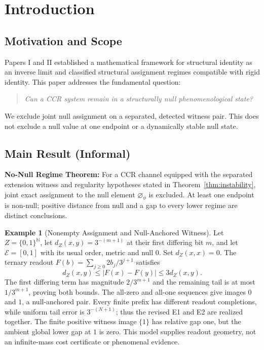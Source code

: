 \documentclass[11pt,a4paper]{article}
\theoremstyle{plain}
\theoremstyle{definition}
\newtheorem{example}[theorem]{Example}
\theoremstyle{remark}
\newcommand{\E}{\mathcal{E}}
\newcommand{\nullphi}{\varnothing_\phi}
\begin{document}
\section{Introduction}

\subsection{Motivation and Scope}

Papers I and II established a mathematical framework for structural identity as an inverse limit and classified structural assignment regimes compatible with rigid identity. This paper addresses the fundamental question:

\begin{quote}
\emph{Can a CCR system remain in a structurally null phenomenological state?}
\end{quote}

We exclude joint null assignment on a separated, detected witness pair. This does not exclude a null value at one endpoint or a dynamically stable null state.

\subsection{Main Result (Informal)}

\textbf{No-Null Regime Theorem:} For a CCR channel equipped with the separated extension witness and regularity hypotheses stated in Theorem~\ref{thm:instability}, joint exact assignment to the null element $\nullphi$ is excluded. At least one endpoint is non-null; positive distance from null and a gap to every lower regime are distinct conclusions.

\begin{example}[Nonempty Assignment and Null-Anchored Witness]\label{ex:null-realization}
Let $Z=\{0,1\}^{\mathbb N}$, let $d_Z(x,y)=3^{-(m+1)}$ at their first differing bit $m$, and let $\E=[0,1]$ with its usual order, metric and null $0$. Set $d_Z(x,x)=0$. The ternary readout $F(b)=\sum_{j\geq0}2b_j/3^{j+1}$ satisfies
\[
d_Z(x,y)\leq |F(x)-F(y)|\leq3d_Z(x,y).
\]
The first differing term has magnitude $2/3^{m+1}$ and the remaining tail is at most $1/3^{m+1}$, proving both bounds. The all-zero and all-one sequences give images $0$ and $1$, a null-anchored pair. Every finite prefix has different readout completions, while uniform tail error is $3^{-(N+1)}$; thus the revised E1 and E2 are realized together. The finite positive witness image $\{1\}$ has relative gap one, but the ambient global lower gap at $1$ is zero. This model supplies readout geometry, not an infinite-mass cost certificate or phenomenal evidence.
\end{example}
\end{document}
